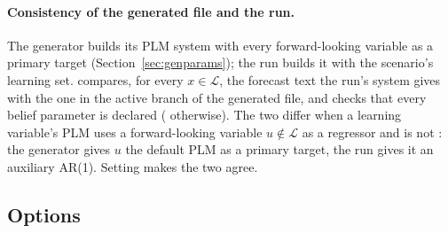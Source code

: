 \documentclass[11pt,a4paper]{article}
\begin{document}
\paragraph{Consistency of the generated file and the run.} The generator builds its PLM system
with every forward-looking variable as a primary target (Section~\ref{sec:genparams}); the run
builds it with the scenario's learning set.  compares, for every
$x\in\mathcal{L}$, the forecast text the run's system gives with the one in the active branch of
the generated file, and checks that every belief parameter is declared
( otherwise). The two differ when a learning variable's PLM
uses a forward-looking variable $u\notin\mathcal{L}$ as a regressor and 
is not : the generator gives $u$ the default PLM as a primary target, the run gives
it an auxiliary AR(1). Setting  makes the two agree.

\subsection{Options}
\end{document}
